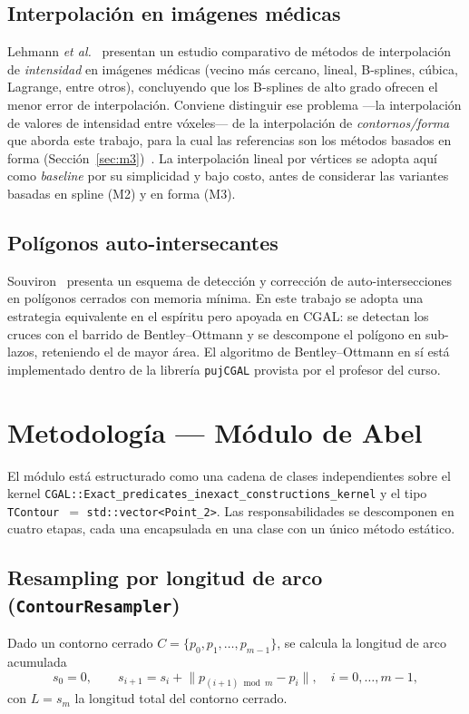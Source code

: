 \documentclass[conference]{IEEEtran}
\begin{document}
\subsection{Interpolación en imágenes médicas}
Lehmann \textit{et al.}~\cite{lehmann1999} presentan un estudio
comparativo de métodos de interpolación de \emph{intensidad} en
imágenes médicas (vecino más cercano, lineal, B-splines, cúbica,
Lagrange, entre otros), concluyendo que los B-splines de alto grado
ofrecen el menor error de interpolación. Conviene distinguir ese
problema ---la interpolación de valores de intensidad entre vóxeles---
de la interpolación de \emph{contornos/forma} que aborda este trabajo,
para la cual las referencias son los métodos basados en forma
(Sección~\ref{sec:m3})~\cite{rayaudupa1990,herman1992}. La
interpolación lineal por vértices se adopta aquí como \textit{baseline}
por su simplicidad y bajo costo, antes de considerar las variantes
basadas en spline (M2) y en forma (M3).

\subsection{Polígonos auto-intersecantes}
Souviron~\cite{souviron2013} presenta un esquema de detección
y corrección de auto-intersecciones en polígonos cerrados con
memoria mínima. En este trabajo se adopta una estrategia
equivalente en el espíritu pero apoyada en CGAL: se detectan
los cruces con el barrido de Bentley--Ottmann y se descompone
el polígono en sub-lazos, reteniendo el de mayor área. El
algoritmo de Bentley--Ottmann en sí está implementado dentro
de la librería \texttt{pujCGAL} provista por el profesor del
curso.

\section{Metodología --- Módulo de Abel}
\label{sec:metodologia}
El módulo está estructurado como una cadena de clases
independientes sobre el kernel
\texttt{CGAL::Exact\_predicates\_inexact\_constructions\_kernel}
y el tipo \texttt{TContour}~$=$
\texttt{std::vector<Point\_2>}. Las responsabilidades se
descomponen en cuatro etapas, cada una encapsulada en una
clase con un único método estático.

\subsection{Resampling por longitud de arco
            (\texttt{ContourResampler})}
Dado un contorno cerrado $C = \{p_0, p_1, \dots, p_{m-1}\}$,
se calcula la longitud de arco acumulada
\begin{equation}
  s_0 = 0,
  \qquad
  s_{i+1} = s_i + \lVert p_{(i+1) \bmod m} - p_i \rVert,
  \quad i = 0, \dots, m-1,
\end{equation}
con $L = s_m$ la longitud total del contorno cerrado.
\end{document}

